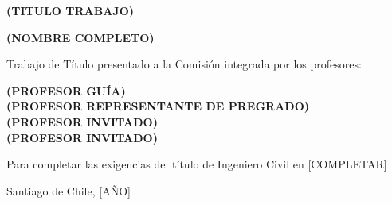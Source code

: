 
\thispagestyle{empty}

\vfill

\begin{coverbody}
  \begin{center}
    {\LARGE\textbf{(TITULO TRABAJO)}\par}

    \vspace{2cm}
    {\large\textbf{(NOMBRE COMPLETO)}\par}
  \end{center}
\end{coverbody}

\vfill

\begin{coverbody}
  Trabajo de Título presentado a la Comisión integrada por los profesores:

  \textbf{(PROFESOR GUÍA)}\\
  \textbf{(PROFESOR REPRESENTANTE DE PREGRADO)}\\
  \textbf{(PROFESOR INVITADO)}\\
  \textbf{(PROFESOR INVITADO)}

  \vspace{1cm}

  Para completar las exigencias del título de
  Ingeniero Civil en [COMPLETAR]
\end{coverbody}

\vfill

\begin{coverbody}
  Santiago de Chile, [AÑO]
\end{coverbody}
\vspace{0.5cm}
\newpage
